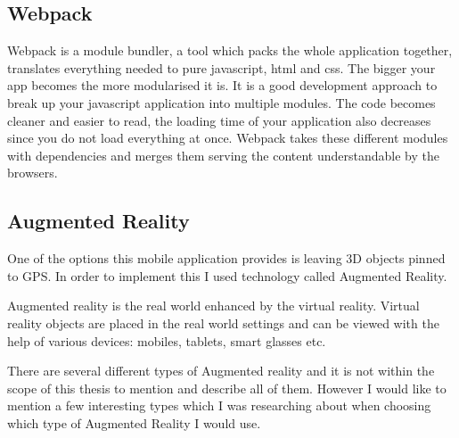 \documentclass[thesis=M,english]{FITthesis}[2012/10/20]
\begin{document}
 
\subsection{Webpack}
Webpack is a module bundler, a tool which packs the whole application together, translates everything needed to pure javascript, html and css. The bigger your app becomes the more modularised it is. It is a good development approach to break up your javascript application into multiple modules. The code becomes cleaner and easier to read, the loading time of your application also decreases since you do not load everything at once. Webpack takes these different modules with dependencies and merges them serving the content understandable by the browsers. \cite{webpack}

 
\subsection{Augmented Reality}

One of the options this mobile application provides is leaving 3D objects pinned to GPS. In order to implement this I used technology called  Augmented Reality.

Augmented reality is the real world enhanced by the virtual reality. Virtual reality objects are placed in the real world settings and can be viewed with the help of various devices: mobiles, tablets, smart glasses etc.

There are several different types of Augmented reality and it is not within the scope of this thesis to mention and describe all of them. However I would like to mention a few interesting types which I was researching about when choosing which type of Augmented Reality I would use.
\end{document}
